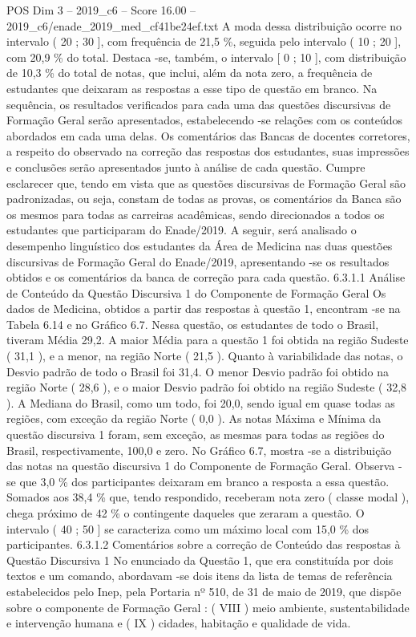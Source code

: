 \begin{textsample}{POS Dim 3 – 2019\_c6 – Score 16.00 – 2019\_c6/enade\_2019\_med\_cf41be24ef.txt}
A moda dessa distribuição ocorre no intervalo ( 20 ; 30 ], com frequência de 21,5 \%, seguida pelo intervalo ( 10 ; 20 ], com 20,9 \% do total.
Destaca -se, também, o intervalo [ 0 ; 10 ], com distribuição de 10,3 \% do total de notas, que inclui, além da nota zero, a frequência de estudantes que deixaram as respostas a esse tipo de questão em branco.
Na sequência, os resultados verificados para cada uma das questões discursivas de Formação Geral serão apresentados, estabelecendo -se relações com os conteúdos abordados em cada uma delas.
Os comentários das Bancas de docentes corretores, a respeito do observado na correção das respostas dos estudantes, suas impressões e conclusões serão apresentados junto à análise de cada questão.
Cumpre esclarecer que, tendo em vista que as questões discursivas de Formação Geral são padronizadas, ou seja, constam de todas as provas, os comentários da Banca são os mesmos para todas as carreiras acadêmicas, sendo direcionados a todos os estudantes que participaram do Enade/2019.
A seguir, será analisado o desempenho linguístico dos estudantes da Área de Medicina nas duas questões discursivas de Formação Geral do Enade/2019, apresentando -se os resultados obtidos e os comentários da banca de correção para cada questão. 6.3.1.1 Análise de Conteúdo da Questão Discursiva 1 do Componente de Formação Geral Os dados de Medicina, obtidos a partir das respostas à questão 1, encontram -se na Tabela 6.14 e no Gráfico 6.7.
Nessa questão, os estudantes de todo o Brasil, tiveram Média 29,2.
A maior Média para a questão 1 foi obtida na região Sudeste ( 31,1 ), e a menor, na região Norte ( 21,5 ).
Quanto à variabilidade das notas, o Desvio padrão de todo o Brasil foi 31,4.
O menor Desvio padrão foi obtido na região Norte ( 28,6 ), e o maior Desvio padrão foi obtido na região Sudeste ( 32,8 ).
A Mediana do Brasil, como um todo, foi 20,0, sendo igual em quase todas as regiões, com exceção da região Norte ( 0,0 ).
As notas Máxima e Mínima da questão discursiva 1 foram, sem exceção, as mesmas para todas as regiões do Brasil, respectivamente, 100,0 e zero.
No Gráfico 6.7, mostra -se a distribuição das notas na questão discursiva 1 do Componente de Formação Geral.
Observa -se que 3,0 \% dos participantes deixaram em branco a resposta a essa questão.
Somados aos 38,4 \% que, tendo respondido, receberam nota zero ( classe modal ), chega próximo de 42 \% o contingente daqueles que zeraram a questão.
O intervalo ( 40 ; 50 ] se caracteriza como um máximo local com 15,0 \% dos participantes. 6.3.1.2 Comentários sobre a correção de Conteúdo das respostas à Questão Discursiva 1 No enunciado da Questão 1, que era constituída por dois textos e um comando, abordavam -se dois itens da lista de temas de referência estabelecidos pelo Inep, pela Portaria nº 510, de 31 de maio de 2019, que dispõe sobre o componente de Formação Geral : ( VIII ) meio ambiente, sustentabilidade e intervenção humana e ( IX ) cidades, habitação e qualidade de vida.

\end{textsample}
